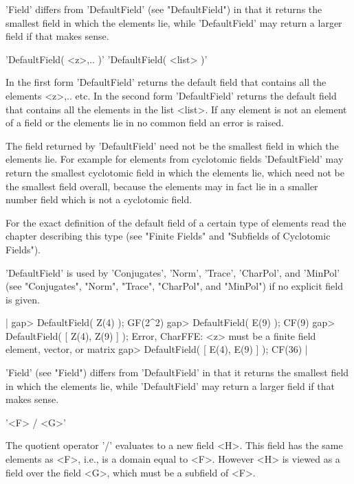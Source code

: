 'Field' differs from  'DefaultField'   (see "DefaultField") in    that it
returns the     smallest  field  in  which   the   elements    lie, while
'DefaultField' may return a larger field if that makes sense.


'DefaultField( <z>,.. )'
'DefaultField( <list> )'

In the first form 'DefaultField' returns the  default field that contains
all the elements <z>,.. etc.  In the  second form 'DefaultField' returns
the default field that contains all the elements in  the list <list>.  If
any element is not an element of a field or the elements lie in no common
field an error is raised.

The field returned by  'DefaultField'  need not be the  smallest field in
which the elements lie.  For example for elements  from cyclotomic fields
'DefaultField' may  return the  smallest  cyclotomic field  in  which the
elements lie, which need not be the  smallest field overall,  because the
elements may  in  fact lie  in  a  smaller number field which   is  not a
cyclotomic field.

For the exact   definition of  the default field  of a   certain type  of
elements read  the chapter describing  this type (see "Finite Fields" and
"Subfields of Cyclotomic Fields").

'DefaultField' is used  by 'Conjugates', 'Norm', 'Trace',  'CharPol', and
'MinPol' (see "Conjugates", "Norm",  "Trace", "CharPol", and "MinPol") if
no explicit field is given.

|    gap> DefaultField( Z(4) );
    GF(2^2)
    gap> DefaultField( E(9) );
    CF(9)
    gap> DefaultField( [ Z(4), Z(9) ] );
    Error, CharFFE: <z> must be a finite field element, vector, or matrix
    gap> DefaultField( [ E(4), E(9) ] );
    CF(36) |

'Field' (see "Field") differs from  'DefaultField' in that it returns the
smallest field in which the elements lie, while 'DefaultField' may return
a larger field if that makes sense.


'<F> / <G>'

The quotient operator '/' evaluates to a new  field  <H>.  This field has
the same elements as <F>, i.e., is a domain equal to <F>.  However <H> is
viewed as a field over the field <G>, which must be a subfield of <F>.

